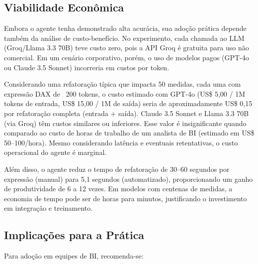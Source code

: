 \documentclass[
    12pt,               %
    openright,          %
    oneside,            %
    a4paper,            %
    chapter=TITLE,      %
    section=TITLE,      %
    brazil              %
]{abntex2}
\begin{document}
\subsection{Viabilidade Econômica}
\label{sec:viabilidade-economica}

Embora o agente tenha demonstrado alta acurácia, sua adoção prática depende também da análise de custo-benefício. No experimento, cada chamada ao LLM (Groq/Llama 3.3 70B) teve custo zero, pois a API Groq é gratuita para uso não comercial. Em um cenário corporativo, porém, o uso de modelos pagos (GPT-4o ou Claude 3.5 Sonnet) incorreria em custos por token.

Considerando uma refatoração típica que impacta 50 medidas, cada uma com expressão DAX de ~200 tokens, o custo estimado com GPT-4o (US\$ 5,00 / 1M tokens de entrada, US\$ 15,00 / 1M de saída) seria de aproximadamente US\$ 0,15 por refatoração completa (entrada + saída). Claude 3.5 Sonnet e Llama 3.3 70B (via Groq) têm custos similares ou inferiores. Esse valor é insignificante quando comparado ao custo de horas de trabalho de um analista de BI (estimado em US\$ 50--100/hora). Mesmo considerando latência e eventuais retentativas, o custo operacional do agente é marginal.

Além disso, o agente reduz o tempo de refatoração de 30--60 segundos por expressão (manual) para 5,1 segundos (automatizado), proporcionando um ganho de produtividade de 6 a 12 vezes. Em modelos com centenas de medidas, a economia de tempo pode ser de horas para minutos, justificando o investimento em integração e treinamento.

\subsection{Implicações para a Prática}
\label{sec:implicacoes-pratica}

Para adoção em equipes de BI, recomenda-se:
\end{document}
